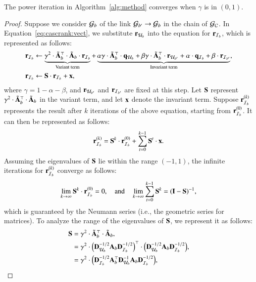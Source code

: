 \begin{theorem}[Convergence] 
\label{theorem:convergence}
The power iteration in Algorithm~\ref{alg:method} converges when $\gamma$ is in $(0, 1)$.
\end{theorem}
\begin{proof}
    Suppose we consider $\mathcal{G}_{b}$ of the link $\mathcal{G}_{b'} \rightarrow \mathcal{G}_{b}$ in the chain of $\mathcal{G}_{\mathcal{C}}$.
    In Equation~\eqref{eq:cascrank:vect}, we substitute $\mathbf{r}_{\mathcal{U}_{b}}$ into the equation for $\mathbf{r}_{\mathcal{I}_{b}}$, which is represented as follows:
    \begin{align*}
        \mathbf{r}_{\mathcal{I}_{b}} &\leftarrow 
        \underbrace{\gamma^2 \cdot \tilde{\mathbf{A}}_{b}^{\top}\cdot\tilde{\mathbf{A}}_{b} \cdot\mathbf{r}_{\mathcal{I}_{b}}}_{\text{Variant term}}
        + \underbrace{\alpha\gamma \cdot \tilde{\mathbf{A}}_{b}^{\top}\cdot\mathbf{q}_{\mathcal{U}_{b}} + \beta\gamma\cdot \tilde{\mathbf{A}}_{b}^{\top}\cdot\mathbf{r}_{\mathcal{U}_{b'}} + \alpha \cdot \mathbf{q}_{\mathcal{I}_{b}} + \beta \cdot \mathbf{r}_{\mathcal{I}_{b'}}}_{\text{Invariant term}}, \\
        \mathbf{r}_{\mathcal{I}_{b}} &\leftarrow \mathbf{S}\cdot\mathbf{r}_{\mathcal{I}_{b}} + \mathbf{x},
    \end{align*}
where $\gamma = 1-\alpha-\beta$, and $\mathbf{r}_{\mathcal{U}_{b'}}$ and $\mathbf{r}_{\mathcal{I}_{b'}}$ are fixed at this step.
Let $\mathbf{S}$ represent $\gamma^{2} \cdot \tilde{\mathbf{A}}_{b}^{\top} \cdot \tilde{\mathbf{A}}_{b}$ in the variant term, and let $\mathbf{x}$ denote the invariant term.
Suppose $\mathbf{r}_{\mathcal{I}_{b}}^{(k)}$ represents the result after $k$ iterations of the above equation, starting from $\mathbf{r}_{\mathcal{I}_{b}}^{(0)}$. It can then be represented as follows:
\begin{align*}
    \mathbf{r}_{\mathcal{I}_{b}}^{(k)} = \mathbf{S}^{k}\cdot\mathbf{r}_{\mathcal{I}_{b}}^{(0)} + \sum_{t=0}^{k-1} \mathbf{S}^{t} \cdot \mathbf{x}.
\end{align*}
Assuming the eigenvalues of $\mathbf{S}$ lie within the range $(-1, 1)$, the infinite iterations for $\mathbf{r}_{\mathcal{I}_{b}}^{(k)}$ converge as follows:
\begin{align*}
\lim_{k\rightarrow\infty}\mathbf{S}^{k}\cdot\mathbf{r}_{\mathcal{I}_{b}}^{(0)} = 0, \quad \text{and} \quad \lim_{k\rightarrow\infty}\sum_{t=0}^{k-1}\mathbf{S}^{k} = (\mathbf{I}-\mathbf{S})^{-1},
\end{align*}
which is guaranteed by the Neumann series (i.e., the geometric series for matrices).
To analyze the range of the eigenvalues of $\mathbf{S}$, we represent it as follows:
\begin{align*}
    \mat{S} &= \gamma^{2}\cdot \Abnorm^{\top}\cdot \Abnorm, \\
    &= \gamma^{2}\cdot\Big(\mat{D}_{\users_b}^{-1/2}\Ab\mat{D}_{\items_b}^{-1/2}\Big)^{\top}\cdot\Big(\mat{D}_{\users_b}^{-1/2}\Ab\mat{D}_{\items_b}^{-1/2} \Big), \\
    &= \gamma^2\cdot \Big(\mat{D}_{\items_b}^{-1/2}\Ab^{\top}\mat{D}_{\users_b}^{-1}\Ab\mat{D}_{\items_b}^{-1/2} \Big), \\

\end{align*}
\end{proof}
